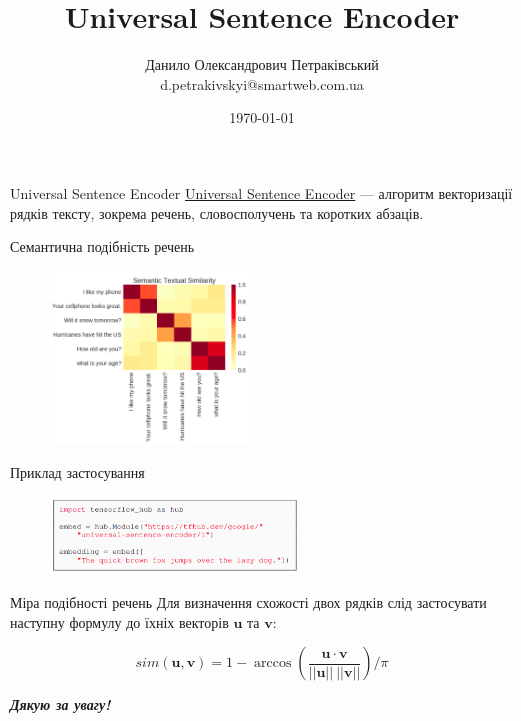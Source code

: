 \documentclass[mathserif]{beamer}
\title{Universal Sentence Encoder}
\institute{prom.ua}
\author[Д.~О.~Петраківський]{Данило Олександрович Петраківський \\ d.petrakivskyi@smartweb.com.ua}
\date{\today}
\begin{document}
    \frame{\titlepage}

    \begin{frame}{Universal Sentence Encoder}
        \href{https://arxiv.org/abs/1803.11175}{Universal Sentence Encoder} --- алгоритм векторизації рядків тексту,
        зокрема речень, словосполучень та коротких абзаців.
    \end{frame}

    \begin{frame}{Семантична подібність речень}
        \begin{figure}[h!]
            \centering
            \includegraphics[width=200px]{images/use-sts}
        \end{figure}
    \end{frame}

    \begin{frame}{Приклад застосування}
        \begin{figure}[h!]
            \centering
            \includegraphics[width=250px]{images/use-code}
        \end{figure}
    \end{frame}

    \begin{frame}{Міра подібності речень}
        Для визначення схожості двох рядків слід застосувати наступну формулу до їхніх векторів $\boldsymbol{u}$ та
        $\boldsymbol{v}$:

        \[
            sim(\boldsymbol{u}, \boldsymbol{v})
            = 1
            - \arccos \left(\frac{\boldsymbol{u} \cdot \boldsymbol{v}}{||\boldsymbol{u}|| \ ||\boldsymbol{v}||}\right) / \pi
        \]
    \end{frame}

    \begin{frame}
        \begin{center}
            \Huge \bfseries \itshape Дякую за увагу!
        \end{center}
    \end{frame}
\end{document}
